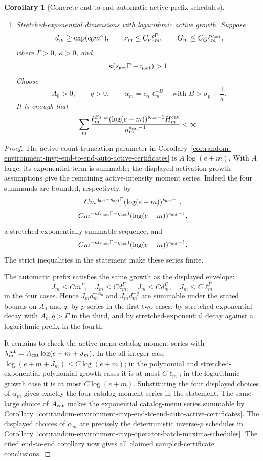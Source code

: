 \documentclass[11pt]{amsart}
\numberwithin{equation}{section}
\newtheorem{corollary}[theorem]{Corollary}
\theoremstyle{definition}
\theoremstyle{remark}
\begin{document}
\begin{corollary}[Concrete end-to-end automatic active-prefix schedules]
\begin{enumerate}[label=\textup{(\roman*)},leftmargin=2.2em]
\item Stretched-exponential dimensions with logarithmic active growth.  Suppose
\[
  d_m\ge\exp(c_0m^\kappa),\qquad
  \nu_m\le C_\nu\ell_m^\Gamma,\qquad
  G_m\le C_G\ell_m^{\eta_{\rm act}},
\]
where \(\Gamma>0\), \(\kappa>0\), and
\[
  \kappa(s_{\rm act}\Gamma-\eta_{\rm act})>1 .
\]
Choose
\[
  A_0>0,\qquad q>0,\qquad
  \alpha_m=c_\alpha\ell_m^{-B}
  \quad\text{with } B>\sigma_p+\frac1\kappa .
\]
It is enough that
\[
  \sum_m
  \frac{\ell_m^{Bs_{\rm cat}}(\log(e+m))^{s_{\rm cat}-1}H_m^{\rm cat}}
       {n_m^{s_{\rm cat}-1}}<\infty .
\]
\end{enumerate}
\end{corollary}

\begin{proof}
The active-count truncation parameter in
Corollary~\ref{cor:random-environment-invp-end-to-end-auto-active-certificates}
is \(A\log(e+m)\).  With \(A\) large, its exponential term is summable; the
displayed activation growth assumptions give the remaining active-intensity
moment series.  Indeed the four summands are bounded, respectively, by
\[
  C m^{\eta_{\rm act}-s_{\rm act}\Gamma}(\log(e+m))^{s_{\rm act}-1},
\]
\[
  C m^{-\kappa(s_{\rm act}\Gamma-\eta_{\rm act})}
    (\log(e+m))^{s_{\rm act}-1},
\]
a stretched-exponentially summable sequence, and
\[
  C m^{-\kappa(s_{\rm act}\Gamma-\eta_{\rm act})}
    (\log(e+m))^{s_{\rm act}-1}.
\]
The strict inequalities in the statement make these series finite.

The automatic prefix satisfies the same growth as the displayed envelope:
\[
  J_m\le C m^\Gamma,\quad
  J_m\le C d_m^\Gamma,\quad
  J_m\le C d_m^\Gamma,\quad
  J_m\le C\ell_m^\Gamma
\]
in the four cases.  Hence \(J_md_m^{-A_0}\) and \(J_md_m^{-q}\) are summable
under the stated bounds on \(A_0\) and \(q\): by \(p\)-series in the first two
cases, by stretched-exponential decay with \(A_0,q>\Gamma\) in the third, and by
stretched-exponential decay against a logarithmic prefix in the fourth.

It remains to check the active-menu catalog moment series with
\(\lambda_m^{\rm cat}=A_{\rm cat}\log(e+m+J_m)\).  In the all-integer case
\(\log(e+m+J_m)\le C\log(e+m)\); in the polynomial and
stretched-exponential polynomial-growth cases it is at most \(C\ell_m\); in the
logarithmic-growth case it is at most \(C\log(e+m)\).  Substituting the four
displayed choices of \(\alpha_m\) gives exactly the four catalog moment series
in the statement.  The same large choice of \(A_{\rm cat}\) makes the
exponential catalog-menu series summable by
Corollary~\ref{cor:random-environment-invp-end-to-end-auto-active-certificates}.
The displayed choices of \(\alpha_m\) are precisely the deterministic
inverse-\(p\) schedules in
Corollary~\ref{cor:random-environment-invp-operator-batch-maxima-schedules}.
The cited end-to-end corollary now gives all claimed sampled-certificate
conclusions.
\end{proof}
\end{document}
